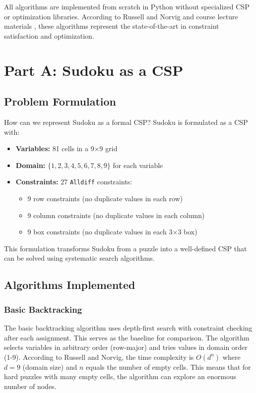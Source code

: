\documentclass[letterpaper]{article}
\begin{document}
All algorithms are implemented from scratch in Python without specialized CSP or optimization libraries. According to Russell and Norvig \cite{russell2020} and course lecture materials \cite{atyabi2025csp,atyabi2025optimization}, these algorithms represent the state-of-the-art in constraint satisfaction and optimization.

\section{Part A: Sudoku as a CSP}

\subsection{Problem Formulation}

How can we represent Sudoku as a formal CSP? Sudoku is formulated as a CSP with:
\begin{itemize}
\item \textbf{Variables:} 81 cells in a 9×9 grid
\item \textbf{Domain:} $\{1, 2, 3, 4, 5, 6, 7, 8, 9\}$ for each variable
\item \textbf{Constraints:} 27 \texttt{Alldiff} constraints:
  \begin{itemize}
  \item 9 row constraints (no duplicate values in each row)
  \item 9 column constraints (no duplicate values in each column)
  \item 9 box constraints (no duplicate values in each 3×3 box)
  \end{itemize}
\end{itemize}

This formulation transforms Sudoku from a puzzle into a well-defined CSP that can be solved using systematic search algorithms.

\subsection{Algorithms Implemented}

\subsubsection{Basic Backtracking}
The basic backtracking algorithm uses depth-first search with constraint checking after each assignment. This serves as the baseline for comparison. The algorithm selects variables in arbitrary order (row-major) and tries values in domain order (1-9). According to Russell and Norvig, the time complexity is $O(d^n)$ where $d=9$ (domain size) and $n$ equals the number of empty cells. This means that for hard puzzles with many empty cells, the algorithm can explore an enormous number of nodes.
\end{document}
